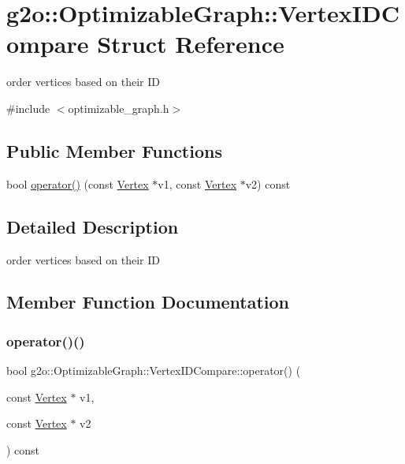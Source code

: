 \hypertarget{structg2o_1_1_optimizable_graph_1_1_vertex_i_d_compare}{}\section{g2o\+:\+:Optimizable\+Graph\+:\+:Vertex\+I\+D\+Compare Struct Reference}
\label{structg2o_1_1_optimizable_graph_1_1_vertex_i_d_compare}


order vertices based on their ID  




{\ttfamily \#include $<$optimizable\+\_\+graph.\+h$>$}

\subsection*{Public Member Functions}
\begin{DoxyCompactItemize}
\item 
bool \mbox{\hyperlink{structg2o_1_1_optimizable_graph_1_1_vertex_i_d_compare_aabbf8cb54cc572189a51fd7353363de9}{operator()}} (const \mbox{\hyperlink{classg2o_1_1_optimizable_graph_1_1_vertex}{Vertex}} $\ast$v1, const \mbox{\hyperlink{classg2o_1_1_optimizable_graph_1_1_vertex}{Vertex}} $\ast$v2) const
\end{DoxyCompactItemize}


\subsection{Detailed Description}
order vertices based on their ID 

\subsection{Member Function Documentation}
\mbox{\label{structg2o_1_1_optimizable_graph_1_1_vertex_i_d_compare_aabbf8cb54cc572189a51fd7353363de9}} 
\subsubsection{\texorpdfstring{operator()()}{operator()()}}
{\footnotesize\ttfamily bool g2o\+::\+Optimizable\+Graph\+::\+Vertex\+I\+D\+Compare\+::operator() (\begin{DoxyParamCaption}\item[{const \mbox{\hyperlink{classg2o_1_1_optimizable_graph_1_1_vertex}{Vertex}} $\ast$}]{v1,  }\item[{const \mbox{\hyperlink{classg2o_1_1_optimizable_graph_1_1_vertex}{Vertex}} $\ast$}]{v2 }\end{DoxyParamCaption}) const\hspace{0.3cm}{\ttfamily [inline]}}



